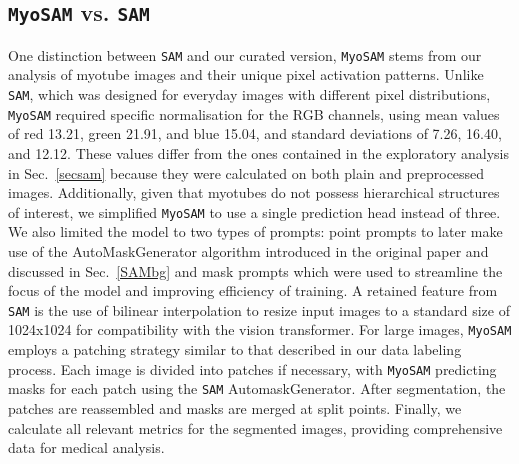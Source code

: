 \subsection{\texttt{MyoSAM} vs. \texttt{SAM}}
One distinction between \texttt{SAM} and our curated version, \texttt{MyoSAM} stems from our analysis of myotube images and their unique pixel activation patterns. Unlike \texttt{SAM}, which was designed for everyday images with different pixel distributions, \texttt{MyoSAM} required specific normalisation for the RGB channels, using mean values of red 13.21, green 21.91, and blue 15.04, and standard deviations of 7.26, 16.40, and 12.12. These values differ from the ones contained in the exploratory analysis in Sec.~\ref{secsam} because they were calculated on both plain and preprocessed images. Additionally, given that myotubes do not possess hierarchical structures of interest, we simplified \texttt{MyoSAM} to use a single prediction head instead of three. We also limited the model to two types of prompts: point prompts to later make use of the AutoMaskGenerator algorithm introduced in the original paper and discussed in Sec.~\ref{SAMbg} and mask prompts which were used to streamline the focus of the model and improving efficiency of training.
A retained feature from \texttt{SAM} is the use of bilinear interpolation to resize input images to a standard size of 1024x1024 for compatibility with the vision transformer. For large images, \texttt{MyoSAM} employs a patching strategy similar to that described in our data labeling process. Each image is divided into patches if necessary, with \texttt{MyoSAM} predicting masks for each patch using the \texttt{SAM} AutomaskGenerator. After segmentation, the patches are reassembled and masks are merged at split points. Finally, we calculate all relevant metrics for the segmented images, providing comprehensive data for medical analysis.

